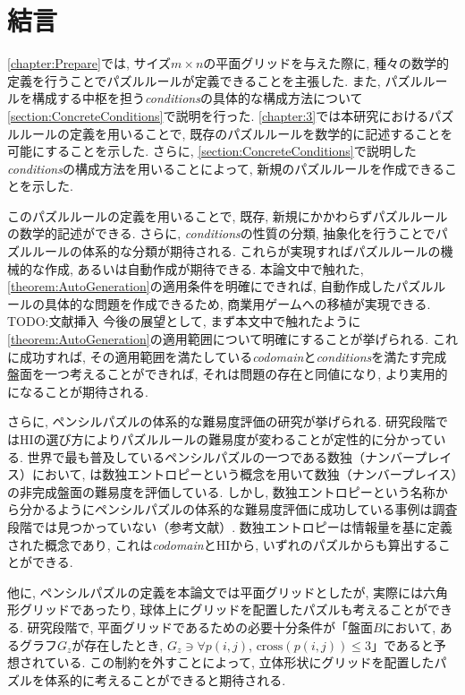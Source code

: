 \chapter{結言}
\cref{chapter:Prepare}では, サイズ$m\times n$の平面グリッドを与えた際に, 種々の数学的定義を行うことでパズルルールが定義できることを主張した. また, パズルルールを構成する中枢を担う\textit{conditions}の具体的な構成方法について\cref{section:ConcreteConditions}で説明を行った. \cref{chapter:3}では本研究におけるパズルルールの定義を用いることで, 既存のパズルルールを数学的に記述することを可能にすることを示した. さらに, \cref{section:ConcreteConditions}で説明した\textit{conditions}の構成方法を用いることによって, 新規のパズルルールを作成できることを示した.

このパズルルールの定義を用いることで, 既存, 新規にかかわらずパズルルールの数学的記述ができる. さらに, \textit{conditions}の性質の分類, 抽象化を行うことでパズルルールの体系的な分類が期待される. これらが実現すればパズルルールの機械的な作成, あるいは自動作成が期待できる. 本論文中で触れた, \cref{theorem:AutoGeneration}の適用条件を明確にできれば, 自動作成したパズルルールの具体的な問題を作成できるため, 商業用ゲームへの移植が実現できる.
TODO:文献挿入
今後の展望として, まず本文中で触れたように\cref{theorem:AutoGeneration}の適用範囲について明確にすることが挙げられる. これに成功すれば, その適用範囲を満たしている\textit{codomain}と\textit{conditions}を満たす完成盤面を一つ考えることができれば, それは問題の存在と同値になり, より実用的になることが期待される.

さらに, ペンシルパズルの体系的な難易度評価の研究が挙げられる. 研究段階ではHIの選び方によりパズルルールの難易度が変わることが定性的に分かっている. 世界で最も普及しているペンシルパズルの一つである数独（ナンバープレイス）において, \cite{Chen2009}は数独エントロピーという概念を用いて数独（ナンバープレイス）の非完成盤面の難易度を評価している. しかし, 数独エントロピーという名称から分かるようにペンシルパズルの体系的な難易度評価に成功している事例は調査段階では見つかっていない（参考文献）. 数独エントロピーは情報量を基に定義された概念であり, これは\textit{codomain}とHIから, いずれのパズルからも算出することができる.

他に, ペンシルパズルの定義を本論文では平面グリッドとしたが, 実際には六角形グリッドであったり, 球体上にグリッドを配置したパズルも考えることができる. 研究段階で, 平面グリッドであるための必要十分条件が「盤面$B$において, あるグラフ$G_z$が存在したとき, $G_z \ni \forall p(i,j)$, $\text{cross}(p(i,j))\le3$」であると予想されている. この制約を外すことによって, 立体形状にグリッドを配置したパズルを体系的に考えることができると期待される.